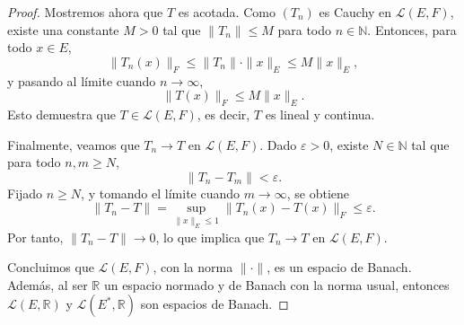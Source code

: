 \begin{proof}
Mostremos ahora que \( T \) es acotada. Como \( (T_n) \) es Cauchy en \( \mathcal{L}(E, F) \), existe una constante \( M > 0 \) tal que \( \|T_n\| \leq M \) para todo \( n \in \mathbb{N} \). Entonces, para todo \( x \in E \),
\[
\|T_n(x)\|_F \leq \|T_n\| \cdot \|x\|_E \leq M \|x\|_E,
\]
y pasando al límite cuando \( n \to \infty \),
\[
\|T(x)\|_F \leq M \|x\|_E.
\]
Esto demuestra que \( T \in \mathcal{L}(E, F) \), es decir, \( T \) es lineal y continua.

Finalmente, veamos que \( T_n \to T \) en \( \mathcal{L}(E, F) \). Dado \( \varepsilon > 0 \), existe \( N \in \mathbb{N} \) tal que para todo \( n, m \geq N \),
\[
\|T_n - T_m\| < \varepsilon.
\]
Fijado \( n \geq N \), y tomando el límite cuando \( m \to \infty \), se obtiene
\[
\|T_n - T\| = \sup_{\|x\|_E \leq 1} \|T_n(x) - T(x)\|_F \leq \varepsilon.
\]
Por tanto, \( \|T_n - T\| \to 0 \), lo que implica que \( T_n \to T \) en \( \mathcal{L}(E, F) \).

\medskip

Concluimos que \( \mathcal{L}(E, F) \), con la norma \( \|\cdot\| \), es un espacio de Banach. Además, al ser $\mathbb{R}$ un espacio normado y de Banach con la norma usual, entonces \( \mathcal{L}(E, \mathbb{R}) \) y \( \mathcal{L}(E^{*}, \mathbb{R}) \) son espacios de Banach.
\end{proof}
\newpage